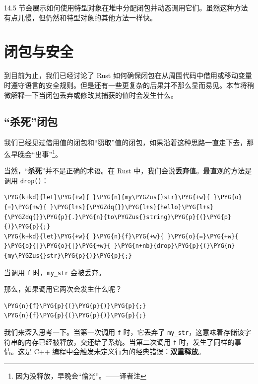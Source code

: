 14.5 节会展示如何使用特型对象在堆中分配闭包并动态调用它们。虽然这种方法有点儿慢，但仍然和特型对象的其他方法一样快。

\section{闭包与安全}

到目前为止，我们已经讨论了 Rust 如何确保闭包在从周围代码中借用或移动变量时遵守语言的安全规则。但是还有一些更复杂的后果并不那么显而易见。本节将稍微解释一下当闭包丢弃或修改其捕获的值时会发生什么。

\subsection{“杀死”闭包}

我们已经见过借用值的闭包和“窃取”值的闭包，如果沿着这种思路一直走下去，那么早晚会“出事”\footnote{因为没释放，早晚会“偷光”。——译者注}。

当然，“\textbf{杀死}”并不是正确的术语。在 Rust 中，我们会说\textbf{丢弃}值。最直观的方法是调用 \texttt{drop()}：

\begin{Verbatim}[commandchars=\\\{\},breaklines=true,breakanywhere=true,fontsize=\codefont,xleftmargin=17bp]
\PYG{k+kd}{let}\PYG{+w}{ }\PYG{n}{my\PYGZus{}str}\PYG{+w}{ }\PYG{o}{=}\PYG{+w}{ }\PYG{l+s}{\PYGZdq{}}\PYG{l+s}{hello}\PYG{l+s}{\PYGZdq{}}\PYG{p}{.}\PYG{n}{to\PYGZus{}string}\PYG{p}{(}\PYG{p}{)}\PYG{p}{;}
\PYG{k+kd}{let}\PYG{+w}{ }\PYG{n}{f}\PYG{+w}{ }\PYG{o}{=}\PYG{+w}{ }\PYG{o}{|}\PYG{o}{|}\PYG{+w}{ }\PYG{n+nb}{drop}\PYG{p}{(}\PYG{n}{my\PYGZus{}str}\PYG{p}{)}\PYG{p}{;}
\end{Verbatim}

当调用 \texttt{f} 时，\texttt{my\_str} 会被丢弃。

那么，如果调用它两次会发生什么呢？

\begin{Verbatim}[commandchars=\\\{\},breaklines=true,breakanywhere=true,fontsize=\codefont,xleftmargin=17bp]
\PYG{n}{f}\PYG{p}{(}\PYG{p}{)}\PYG{p}{;}
\PYG{n}{f}\PYG{p}{(}\PYG{p}{)}\PYG{p}{;}
\end{Verbatim}

我们来深入思考一下。当第一次调用 \texttt{f} 时，它丢弃了 \texttt{my\_str}，这意味着存储该字符串的内存已经被释放，交还给了系统。当第二次调用 \texttt{f} 时，发生了同样的事情。这是 C++ 编程中会触发未定义行为的经典错误：\textbf{双重释放}。

